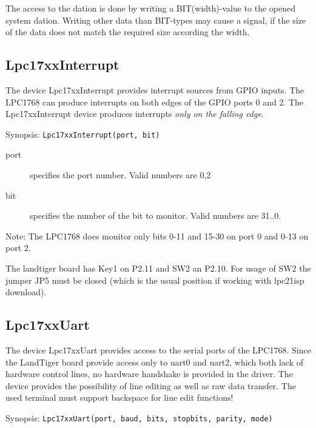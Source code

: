 The access to the dation is done by writing a BIT(width)-value to the
opened system dation.
Writing other data than BIT-types  may cause a signal, if the size of the
data does not match the required size according the width.

\subsection{Lpc17xxInterrupt}
The device Lpc17xxInterrupt provides interrupt sources from GPIO inputs.
The LPC1768 can produce interrupts on both edges of the GPIO ports 0 and 2.
The Lpc17xxInterrupt device produces interrupts {\em only on the falling edge}. 

Synopsis: \verb|Lpc17xxInterrupt(port, bit)|

\begin{description}
\item [port] specifies the port number. Valid numbers are 0,2
\item[bit] specifies the number of the  bit to monitor.
 Valid numbers are 31..0. 
\end{description}

Note: The LPC1768 does monitor only bits
0-11 and 15-30 on port 0 and 0-13 on port 2.

The landtiger board has Key1 on P2.11 and SW2 an P2.10.
For usage of SW2 the jumper JP5 must be closed (which is the
usual position if working with lpc21isp download).


\subsection{Lpc17xxUart}
The device Lpc17xxUart provides access to the serial ports of the LPC1768.
Since the LandTiger board provide access only to uart0 and uart2, which
both lack of hardware control lines, no hardware handshake is provided 
in the driver.
The device provides the possibility of line editing as well as raw data
transfer.
The used terminal must support backspace for line edit functions!

Synopsis: \verb|Lpc17xxUart(port, baud, bits, stopbits, parity, mode)|

